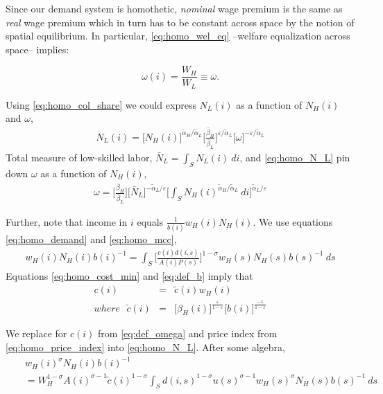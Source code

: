 \documentclass{article}
\begin{document}
Since our demand system is homothetic, \textit{nominal} wage premium is the same as \textit{real} wage premium which in turn has to be constant across space by the notion of spatial equilibrium. In particular, \eqref{eq:homo_wel_eq} --welfare equalization across space-- implies:

\[
\omega(i) = \frac{W_H}{W_L} \equiv \omega.
\]

Using \eqref{eq:homo_col_share} we could express $N_L(i)$ as a function of $N_H(i)$ and $\omega$,
\begin{eqnarray}
    \label{eq:homo_N_L}
	N_L(i) = \Big[N_H(i)\Big]^{\tilde{\alpha}_H/\tilde{\alpha}_L} \Big[\frac{\bar{\beta}_H}{\bar{\beta}_L} \Big]^{\varepsilon/\tilde{\alpha}_L} \Big[\omega\Big]^{-\varepsilon/\tilde{\alpha}_L}
\end{eqnarray}
Total measure of low-skilled labor, 
$ \bar{N}_L = \int_S N_L(i)~di $, and 
 \eqref{eq:homo_N_L} pin down $\omega$ as a function of $N_H(i)$,
\begin{eqnarray}
    \label{eq:def_omega}
\omega = 
\Big[ \frac{\bar{\beta}_H}{\bar{\beta}_L}\Big]\Big[ \bar{N}_L
\Big]^{-\tilde{\alpha}_L/\varepsilon}
\Big[ \int_S N_H(i)^{\tilde{\alpha}_H/\tilde{\alpha}_L}~di \Big]^{\tilde{\alpha}_L/\varepsilon}
\end{eqnarray}

Further, note that income in $i$ equals
$\frac{1}{b(i)} w_H(i)N_H(i)$. We use equations \eqref{eq:homo_demand}
and \eqref{eq:homo_mcc},
\begin{eqnarray}
	w_H(i) N_H(i) b(i)^{-1} = 
	\int_S \Big[ \frac{c(i) d(i,s)}{A(i) P(s)} \Big]^{1-\sigma} w_H(s) N_H(s) b(s)^{-1} ~ds \nonumber
\end{eqnarray}
Equations \eqref{eq:homo_cost_min} and \eqref{eq:def_b} imply that 
\begin{eqnarray}
    \label{eq:def_tilde_c}
	c(i) & = & \tilde{c}(i) w_H(i) \nonumber \\
	where~~~ \tilde{c}(i) & = & 
	\Big[\beta_H(i)\Big] ^{\frac{\varepsilon}{1-\varepsilon}} \Big[b(i)\Big]^{\frac{-1}{1-\varepsilon}}
\end{eqnarray}

We replace for $c(i)$ from \eqref{eq:def_omega} and price index from \eqref{eq:homo_price_index} into \eqref{eq:homo_N_L}. After some algebra,
\begin{eqnarray}
    \label{eq:homo_eq_cond_append_1}
	& & w_H(i)^{\sigma} N_H(i) b(i)^{-1} \nonumber \\
	& & =  
	W_H^{1-\sigma} A(i)^{\sigma-1} \tilde{c}(i)^{1-\sigma}
	\int_S d(i,s)^{1-\sigma} u(s)^{\sigma-1} w_H(s)^{\sigma} N_H(s) b(s)^{-1}  ~ds \nonumber \\
\end{eqnarray}
\end{document}
